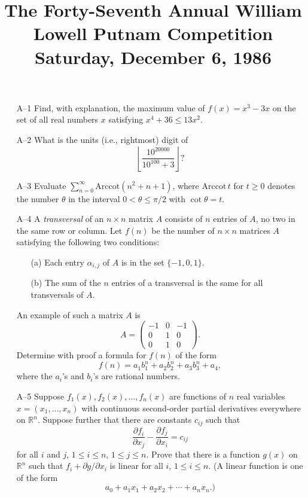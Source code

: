 \documentclass[amssymb,twocolumn,pra,10pt,aps]{revtex4-1}
\begin{document}
\title{The Forty-Seventh Annual William Lowell Putnam Competition \\
    Saturday, December 6, 1986}
\maketitle

\begin{itemize}
\item[A--1]
Find, with explanation, the maximum value of $f(x)=x^3-3x$ on the
set of all real numbers $x$ satisfying $x^4+36\leq 13x^2$.

\item[A--2]
What is the units (i.e., rightmost) digit of
\[
\left\lfloor \frac{10^{20000}}{10^{100}+3}\right\rfloor ?
\]

\item[A--3]
Evaluate $\sum_{n=0}^\infty \mathrm{Arccot}(n^2+n+1)$, where
$\mathrm{Arccot}\,t$ for $t \geq 0$ denotes the number $\theta$ in the
interval $0 < \theta \leq \pi/2$ with $\cot \theta = t$.

\item[A--4]
A \emph{transversal} of an $n\times n$ matrix $A$ consists of $n$
entries of $A$, no two in the same row or column. Let $f(n)$ be the
number of $n \times n$ matrices $A$ satisfying the following two
conditions:
\begin{enumerate}
\item[(a)] Each entry $\alpha_{i,j}$ of $A$ is in the set
$\{-1,0,1\}$.
\item[(b)] The sum of the $n$ entries of a transversal is the same for
all transversals of $A$.
\end{enumerate}
An example of such a matrix $A$ is
\[
A = \left( \begin{array}{ccc} -1 & 0 & -1 \\ 0 & 1 & 0 \\ 0 & 1 & 0
\end{array}
\right).
\]
Determine with proof a formula for $f(n)$ of the form
\[
f(n) = a_1 b_1^n + a_2 b_2^n + a_3 b_3^n + a_4,
\]
where the $a_i$'s and $b_i$'s are rational numbers.

\item[A--5]
Suppose $f_1(x), f_2(x), \dots, f_n(x)$ are functions of $n$ real
variables $x = (x_1, \dots, x_n)$ with continuous second-order partial
derivatives everywhere on $\mathbb{R}^n$. Suppose further that there are
constants $c_{ij}$ such that
\[
\frac{\partial f_i}{\partial x_j} - \frac{\partial f_j}{\partial x_i}
= c_{ij}
\]
for all $i$ and $j$, $1\leq i \leq n$, $1 \leq j \leq n$. Prove that
there is a function $g(x)$ on $\mathbb{R}^n$ such that $f_i + \partial
g/\partial x_i$ is linear for all $i$, $1 \leq i \leq n$. (A linear
function is one of the form
\[
a_0 + a_1 x_1 + a_2 x_2 + \cdots + a_n x_n.)
\]


\end{itemize}
\end{document}
